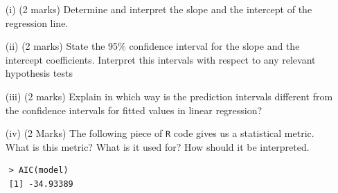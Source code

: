 \documentclass[a4paper,12pt]{article}
\begin{document}
\begin{itemize}
	\item[(i)] (2 marks)
	Determine and interpret the slope and the intercept of the regression line.
	\item[(ii)]  (2 marks) State the 95\% confidence interval for the slope and the intercept coefficients. Interpret this intervals with respect to any relevant hypothesis tests
	\item[(iii)] (2 marks) Explain in which way is the prediction intervals different from the confidence intervals for fitted values in linear regression?
	\item[(iv)] (2 Marks) The following piece of \texttt{R} code gives us a statistical metric. What is this metric? What is it used for? How should it be interpreted.
	
\end{itemize}
\begin{framed}
	\begin{verbatim}
	> AIC(model)
	[1] -34.93389	
	\end{verbatim}
\end{framed}
\newpage
\end{document}
